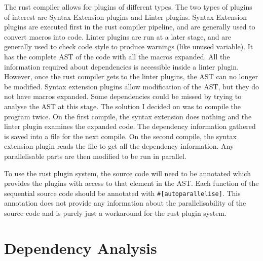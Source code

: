 The rust compiler allows for plugins of different types. The two types of plugins of interest are Syntax Extension plugins and Linter plugins. Syntax Extension plugins are executed first in the rust compiler pipeline, and are generally used to convert macros into code. Linter plugins are run at a later stage, and are generally used to check code style to produce warnings (like unused variable). It has the complete AST of the code with all the macros expanded. All the information required about dependencies is accessible inside a linter plugin. However, once the rust compiler gets to the linter plugins, the AST can no longer be modified. Syntax extension plugins allow modification of the AST, but they do not have macros expanded. Some dependencies could be missed by trying to analyse the AST at this stage. The solution I decided on was to compile the program twice. On the first compile, the syntax extension does nothing and the linter plugin examines the expanded code. The dependency information gathered is saved into a file for the next compile. On the second compile, the syntax extension plugin reads the file to get all the dependency information. Any parallelisable parts are then modified to be run in parallel.

To use the rust plugin system, the source code will need to be annotated which provides the plugins with access to that element in the AST. Each function of the sequential source code should be annotated with \texttt{\#[autoparallelise]}. This annotation does not provide any information about the parallelisability of the source code and is purely just a workaround for the rust plugin system.

\section{Dependency Analysis}


